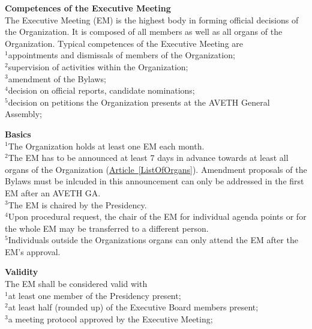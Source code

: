 \documentclass[10pt]{article}
\newcounter{qcounter}
\begin{document}
\begin{list}{{\bf Article :~}}{}
\item {\bf Competences of the Executive Meeting}\label{EM}\\
The Executive Meeting (EM) is the highest body in forming official decisions of the Organization. It is composed of all members as well as all organs of the Organization. Typical competences of the Executive Meeting are\\
$^{1}$appointments and dismissals of members of the Organization;\\
$^{2}$supervision of activities within the Organization;\\
$^{3}$amendment of the Bylaws;\\
$^{4}$decision on official reports, candidate nominations;\\
$^{5}$decision on petitions the Organization presents at the AVETH General Assembly;\\

\item {\bf Basics}\\
$^{1}$The Organization holds at least one EM each month.\\
$^{2}$The EM has to be announced at least 7 days in advance towards at least all organs of the Organization (\hyperref[ListOfOrgans]{Article~\ref{ListOfOrgans}}). Amendment proposals of the Bylaws must be inlcuded in this announcement can only be addressed in the first EM after an AVETH GA.\\
$^{3}$The EM is chaired by the Presidency.\\
$^{4}$Upon procedural request, the chair of the EM for individual agenda points or for the whole EM may be transferred to a different person.\\
$^{5}$Individuals outside the Organizations organs can only attend the EM after the EM's approval. 

\item {\bf Validity}\\
The EM shall be considered valid with\\
$^{1}$at least one member of the Presidency present; \\
$^{2}$at least half (rounded up) of the Executive Board members present; \\
$^{3}$a meeting protocol approved by the Executive Meeting; \\


\end{list}
\end{document}
